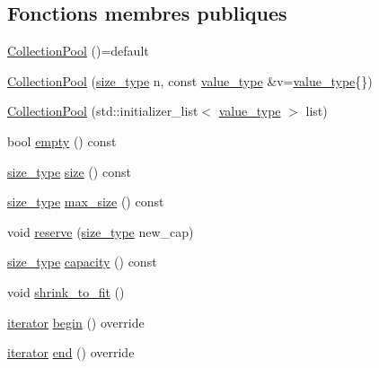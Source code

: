 \subsection*{Fonctions membres publiques}
\begin{DoxyCompactItemize}
\item 
\hyperlink{class_collection_pool_a6e58d0618310fcb2d5114a41c346c1f8}{Collection\+Pool} ()=default
\item 
\hyperlink{class_collection_pool_a65f8fd9c44e03d841391dd50fe953d4a}{Collection\+Pool} (\hyperlink{class_collection_a3f8b024f587aa20be530866da30948c4}{size\+\_\+type} n, const \hyperlink{class_collection_pool_a018a408f2c2bcdf2b542141dbc1d1c17}{value\+\_\+type} \&v=\hyperlink{class_collection_pool_a018a408f2c2bcdf2b542141dbc1d1c17}{value\+\_\+type}\{\})
\item 
\hyperlink{class_collection_pool_a20a624365d44f3b3ae562022d363235b}{Collection\+Pool} (std\+::initializer\+\_\+list$<$ \hyperlink{class_collection_pool_a018a408f2c2bcdf2b542141dbc1d1c17}{value\+\_\+type} $>$ list)
\item 
bool \hyperlink{class_collection_pool_ad73cd0612ec1fd21962f4d423b45b3f6}{empty} () const
\item 
\hyperlink{class_collection_a3f8b024f587aa20be530866da30948c4}{size\+\_\+type} \hyperlink{class_collection_pool_aa5b3ebca322cda930b17a0cfab3f91f2}{size} () const
\item 
\hyperlink{class_collection_a3f8b024f587aa20be530866da30948c4}{size\+\_\+type} \hyperlink{class_collection_pool_a333a1edf4c98229f47b698463baf0324}{max\+\_\+size} () const
\item 
void \hyperlink{class_collection_pool_a06334969f57ca768241af598f03e8de1}{reserve} (\hyperlink{class_collection_a3f8b024f587aa20be530866da30948c4}{size\+\_\+type} new\+\_\+cap)
\item 
\hyperlink{class_collection_a3f8b024f587aa20be530866da30948c4}{size\+\_\+type} \hyperlink{class_collection_pool_a72521883b8761babd44d76a4283d6978}{capacity} () const
\item 
void \hyperlink{class_collection_pool_a99d7be7a85d94c4288683b900af1e087}{shrink\+\_\+to\+\_\+fit} ()
\item 
\hyperlink{class_collection_a317dca4fdf1eb2e47643bb60c620f802}{iterator} \hyperlink{class_collection_pool_ae13d478a26554da9211db064285c7b0b}{begin} () override
\item 
\hyperlink{class_collection_a317dca4fdf1eb2e47643bb60c620f802}{iterator} \hyperlink{class_collection_pool_a870a85422595d6533688704ebe43b520}{end} () override
\end{DoxyCompactItemize}



